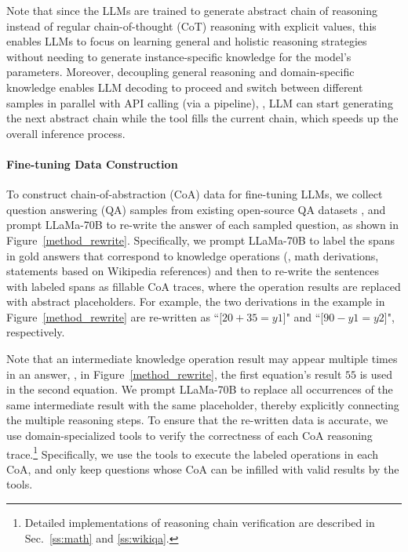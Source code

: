 Note that since the LLMs are trained to generate abstract chain of reasoning instead of regular chain-of-thought (CoT) reasoning with explicit values, this enables LLMs to focus on learning general and holistic reasoning strategies without needing to generate instance-specific knowledge for the model's parameters.  
Moreover, decoupling general reasoning and domain-specific knowledge enables LLM decoding to proceed and switch between different samples in parallel with API calling (via a pipeline), \ie{}, LLM can start generating the next abstract chain while the tool fills the current chain, which speeds up the overall inference process.

\paragraph{Fine-tuning Data Construction}

To construct chain-of-abstraction (CoA) data for fine-tuning LLMs, we collect question answering (QA) samples from existing open-source QA datasets \citep{cobbe2021training,miao2020diverse,yang2018hotpotqa}, and prompt LLaMa-70B \citep{touvron2023llama} to re-write the answer of each sampled question, as shown in Figure~\ref{method_rewrite}.
Specifically, we prompt LLaMa-70B to label the spans in gold answers that correspond to knowledge operations (\eg{}, math derivations, statements based on Wikipedia references) and then to re-write the sentences with labeled spans as fillable CoA traces, where the operation results are replaced with abstract placeholders.
For example, the two derivations in the example in Figure~\ref{method_rewrite} are re-written as ``[$20 + 35 = y1$]" and ``[$90 - y1 = y2$]", respectively.

Note that an intermediate knowledge operation result may appear multiple times in an answer, \eg{}, in Figure~\ref{method_rewrite}, the first equation's result $55$ is used in the second equation.
We prompt LLaMa-70B to replace all occurrences of the same intermediate result with the same placeholder, thereby explicitly connecting the multiple reasoning steps.
To ensure that the re-written data is accurate, we use domain-specialized tools to verify the correctness of each CoA reasoning trace.\footnote{Detailed implementations of reasoning chain verification are described in Sec.~\ref{ss:math} and \ref{ss:wikiqa}.}
Specifically, we use the tools to execute the labeled operations in each CoA, and only keep questions whose CoA can be infilled with valid results by the tools.

